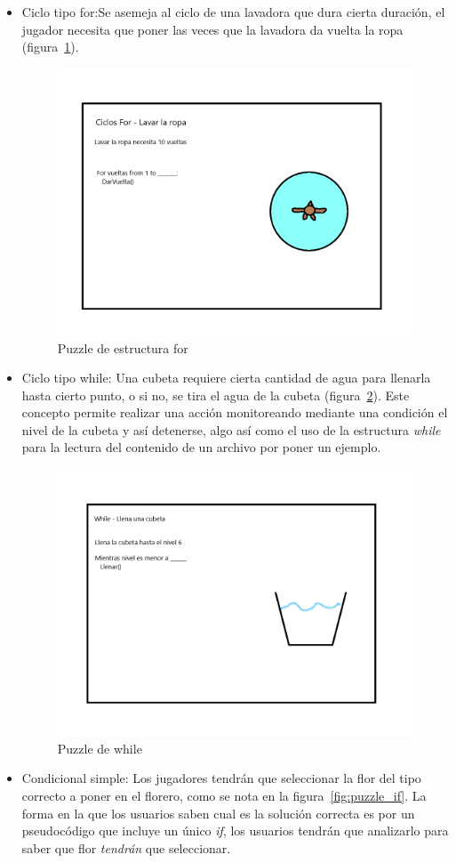 \begin{itemize}
    \item Ciclo tipo for:Se asemeja al ciclo de una lavadora que dura cierta duración, el jugador necesita que poner las veces que la lavadora da vuelta la ropa (figura~\ref{fig:puzzle_for}).
    \begin{figure}[H]
        \centering
        \includegraphics[width=0.5\linewidth]{images/PuzzleFor.png}
        \caption{Puzzle de estructura for}
        \label{fig:puzzle_for}
    \end{figure}
    \item Ciclo tipo while: Una cubeta requiere cierta cantidad de agua para llenarla hasta cierto punto, o si no, se tira el agua de la cubeta (figura~\ref{fig:while_puzzle}). Este concepto permite realizar una acción monitoreando mediante una condición el nivel de la cubeta y así detenerse, algo así como el uso de la estructura \textit{while} para la lectura del contenido de un archivo por poner un ejemplo.
        \begin{figure}[H]
            \centering
            \includegraphics[width=0.5\linewidth]{images/WhilePuzzle.png}
            \caption{Puzzle de while}
            \label{fig:while_puzzle}
        \end{figure}
    \item Condicional simple: Los jugadores tendrán que seleccionar la flor del tipo correcto a poner en el florero, como se nota en la figura~\ref{fig:puzzle_if}. La forma en la que los usuarios saben cual es la solución correcta es por un pseudocódigo que incluye un único \textit{if}, los usuarios tendrán que analizarlo para saber que flor \textit{tendrán} que seleccionar.

\end{itemize}
